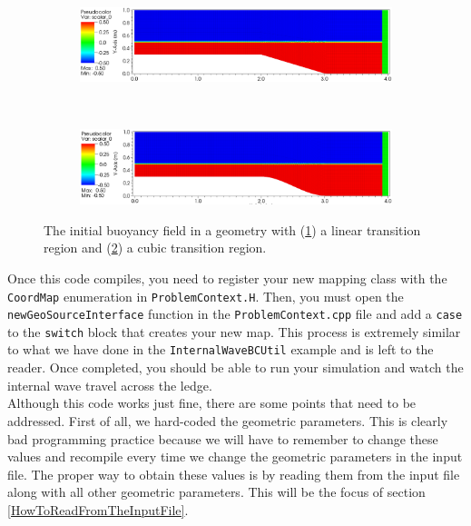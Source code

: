 \documentclass[12pt]{article}
\begin{document}
\begin{figure}
\centering
\begin{subfigure}{\textwidth}
  \centering
  \includegraphics[width=\textwidth]{LedgeMap_ICLinear.png}
  \caption{}
  \label{fig:LedgeMapICLinear}
\end{subfigure}
\\
\begin{subfigure}{\textwidth}
  \centering
  \includegraphics[width=\textwidth]{LedgeMap_ICCubic.png}
  \caption{}
  \label{fig:LedgeMapICCubic}
\end{subfigure}
\caption{The initial buoyancy field in a geometry with (\ref{fig:LedgeMapICLinear}) a linear transition region and (\ref{fig:LedgeMapICCubic}) a cubic transition region.}
\label{fig:LedgeMapICs}
\end{figure}

Once this code compiles, you need to register your new mapping class with the \texttt{CoordMap} enumeration in \texttt{ProblemContext.H}. Then, you must open the \texttt{newGeoSourceInterface} function in the \texttt{ProblemContext.cpp} file and add a \texttt{case} to the \texttt{switch} block that creates your new map. This process is extremely similar to what we have done in the \texttt{InternalWaveBCUtil} example and is left to the reader. Once completed, you should be able to run your simulation and watch the internal wave travel across the ledge.\\

Although this code works just fine, there are some points that need to be addressed. First of all, we hard-coded the geometric parameters. This is clearly bad programming practice because we will have to remember to change these values and recompile every time we change the geometric parameters in the input file. The proper way to obtain these values is by reading them from the input file along with all other geometric parameters. This will be the focus of section \ref{HowToReadFromTheInputFile}.\\
\end{document}
